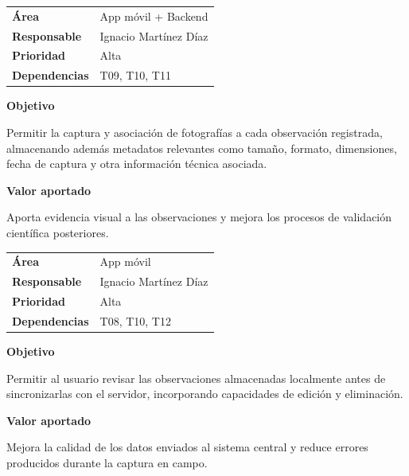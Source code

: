\begin{tcolorbox}[title=T12 -- Fotos por observación y metadatos,colback=gray!5,colframe=black!70,fonttitle=\bfseries]

\begin{tabularx}{\textwidth}{lX}
\textbf{Área} & App móvil + Backend \\
\textbf{Responsable} & Ignacio Martínez Díaz \\
\textbf{Prioridad} & Alta \\
\textbf{Dependencias} & T09, T10, T11 \\
\end{tabularx}

\vspace{0.2cm}

\textbf{Objetivo}

Permitir la captura y asociación de fotografías a cada observación registrada,
almacenando además metadatos relevantes como tamaño, formato, dimensiones,
fecha de captura y otra información técnica asociada.

\vspace{0.15cm}

\textbf{Valor aportado}

Aporta evidencia visual a las observaciones y mejora los procesos de validación
científica posteriores.

\end{tcolorbox}

\begin{tcolorbox}[title=T13 -- Revisión, edición y eliminación antes de sincronizar,colback=gray!5,colframe=black!70,fonttitle=\bfseries]

\begin{tabularx}{\textwidth}{lX}
\textbf{Área} & App móvil \\
\textbf{Responsable} & Ignacio Martínez Díaz \\
\textbf{Prioridad} & Alta \\
\textbf{Dependencias} & T08, T10, T12 \\
\end{tabularx}

\vspace{0.2cm}

\textbf{Objetivo}

Permitir al usuario revisar las observaciones almacenadas localmente antes de
sincronizarlas con el servidor, incorporando capacidades de edición y eliminación.

\vspace{0.15cm}

\textbf{Valor aportado}

Mejora la calidad de los datos enviados al sistema central y reduce errores
producidos durante la captura en campo.

\end{tcolorbox}

